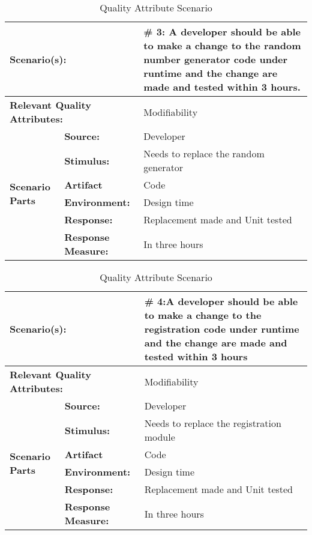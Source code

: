 \begin{table}[H]
\begin{center}
\begin{tabular}{|p{0.3cm}|p{2.5cm}|p{8cm}|}
  \hline
  \multicolumn{2}{|p{3cm}|}{\bfseries Scenario(s):} & \#  3: A developer should be able to make a change to the random number generator code under runtime and the change are made and tested within 3 hours. \\
  \hline
  \multicolumn{2}{|p{3cm}|}{\bfseries Relevant Quality Attributes:} & Modifiability\\
  \hline
  \multirow{6}{*}{\begin{sideways}{\bfseries Scenario Parts}\end{sideways}}
  & {\bfseries Source:} & Developer \\
  \cline{2-3}
  & {\bfseries Stimulus:} & Needs to replace the random generator \\
  \cline{2-3}
  & {\bfseries Artifact} &  Code \\
  \cline{2-3}
  & {\bfseries Environment:} &  Design time \\
  \cline{2-3}
  & {\bfseries Response:} &  Replacement made and Unit tested\\
  \cline{2-3}
  & {\bfseries Response Measure:} & In three hours\\
  \hline
\end{tabular}
\caption{Quality Attribute Scenario}
\end{center}
\end{table}

\begin{table}[H]
\begin{center}
\begin{tabular}{|p{0.3cm}|p{2.5cm}|p{8cm}|}
  \hline
  \multicolumn{2}{|p{3cm}|}{\bfseries Scenario(s):} & \#  4:A developer should be able to make a change to the registration code under runtime and the change are made and tested within 3 hours \\
  \hline
  \multicolumn{2}{|p{3cm}|}{\bfseries Relevant Quality Attributes:} & Modifiability\\
  \hline
  \multirow{6}{*}{\begin{sideways}{\bfseries Scenario Parts}\end{sideways}}
  & {\bfseries Source:} & Developer \\
  \cline{2-3}
  & {\bfseries Stimulus:} & Needs to replace the registration module \\
  \cline{2-3}
  & {\bfseries Artifact} &  Code \\
  \cline{2-3}
  & {\bfseries Environment:} &  Design time \\
  \cline{2-3}
  & {\bfseries Response:} &  Replacement made and Unit tested\\
  \cline{2-3}
  & {\bfseries Response Measure:} & In three hours\\
  \hline
\end{tabular}
\caption{Quality Attribute Scenario}
\end{center}
\end{table}


